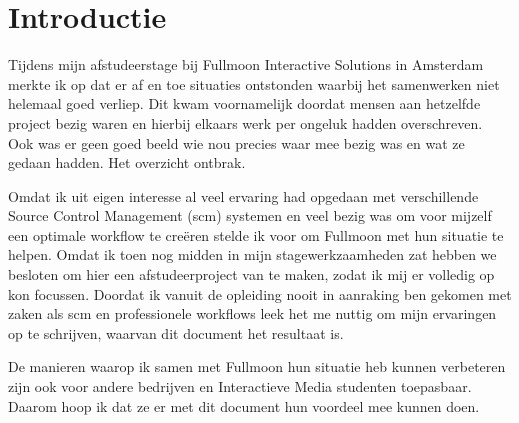 \setcounter{chapter}{0}
\chapter{Introductie}
  
Tijdens mijn afstudeerstage bij Fullmoon Interactive Solutions in Amsterdam merkte ik op dat er af en toe situaties ontstonden waarbij het samenwerken niet helemaal goed verliep. Dit kwam voornamelijk doordat mensen aan hetzelfde project bezig waren en hierbij elkaars werk per ongeluk hadden overschreven. Ook was er geen goed beeld wie nou precies waar mee bezig was en wat ze gedaan hadden. Het overzicht ontbrak.
  
Omdat ik uit eigen interesse al veel ervaring had opgedaan met verschillende Source Control Management ({\sc scm}) systemen en veel bezig was om voor mijzelf een optimale workflow te creëren stelde ik voor om Fullmoon met hun situatie te helpen. Omdat ik toen nog midden in mijn stagewerkzaamheden zat hebben we besloten om hier een afstudeerproject van te maken, zodat ik mij er volledig op kon focussen. Doordat ik vanuit de opleiding nooit in aanraking ben gekomen met zaken als {\sc scm} en professionele workflows leek het me nuttig om mijn ervaringen op te schrijven, waarvan dit document het resultaat is.

De manieren waarop ik samen met Fullmoon hun situatie heb kunnen verbeteren zijn ook voor andere bedrijven en Interactieve Media studenten toepasbaar. Daarom hoop ik dat ze er met dit document hun voordeel mee kunnen doen.
